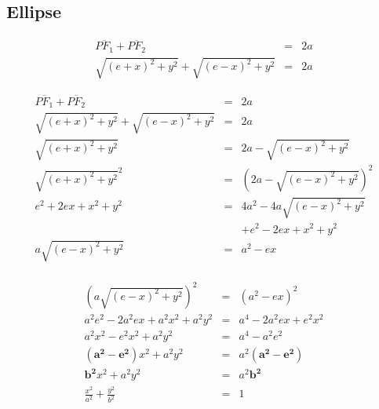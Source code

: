 \subsection{Ellipse}
\begin{frame}
\begin{figure}[h]
	\centering
		\resizebox{.5\linewidth}{!}{
			
		}
\end{figure}
\begin{displaymath}
	\begin{array}{rcl}
		\overline{{PF}_1} + \overline{{PF}_2} & = & 2a\\
		\sqrt{{(e+x)}^2 + y^2} + \sqrt{{(e-x)}^2 + y^2} & = & 2a
	\end{array}
\end{displaymath}
\end{frame}

\begin{frame}
\begin{displaymath}
	\begin{array}{rcl}
		\overline{{PF}_1} + \overline{{PF}_2} & = & 2a\\
		\sqrt{{(e+x)}^2 + y^2} + \sqrt{{(e-x)}^2 + y^2} & = & 2a\\
		\sqrt{{(e+x)}^2 + y^2} & = & 2a - \sqrt{{(e-x)}^2 + y^2}\\
		\sqrt{{(e+x)}^2 + y^2}^2 & = & \left (2a - \sqrt{{(e-x)}^2 + y^2}\right )^2\\
		e^2 + 2ex + x^2 + y^2 & = & 4a^2 - 4a \sqrt{(e-x)^2+y^2}\\
		&& + e^2 - 2ex + x^2 + y^2\\
		a\sqrt{{(e-x)}^2 + y^2} & = & a^2 - ex\\
	\end{array}
\end{displaymath}
\end{frame}

\begin{frame}
\begin{displaymath}
	\begin{array}{rcl}
		\left (a\sqrt{{(e-x)}^2 + y^2}\right )^2 & = & \left(a^2 - ex\right)^2\\
		a^2e^2 - 2a^2ex + a^2x^2 + a^2y^2 &=& a^4 - 2a^2ex + e^2x^2\\
		a^2x^2 - e^2x^2 + a^2y^2 &=& a^4 - a^2e^2\\
		\mathbf{\left(a^2 - e^2\right)}x^2 + a^2y^2 &=& a^2\mathbf{\left(a^2 - e^2\right)}\\
		\mathbf{b^2}x^2 + a^2y^2 &=& a^2\mathbf{b^2}\\
		\frac{x^2}{a^2} + \frac{y^2}{b^2} &=& 1
	\end{array}
\end{displaymath}
\end{frame}


